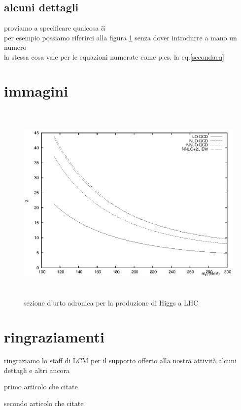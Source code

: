 \documentclass[12pt]{article}
\newcommand{\alphah}{\mbox{$\hat{\alpha}$}}
\begin{document}
\clearpage

\subsection{alcuni dettagli}
proviamo a specificare qualcosa \alphah\\
per esempio possiamo riferirci alla figura \ref{cspph} senza dover 
introdurre a mano un numero\\
la stessa cosa vale per le equazioni numerate come p.es. la eq.\ref{secondaeq}

\section{immagini}
\begin{figure}
\includegraphics[height=100mm,angle=0]{pph.ps}
\caption{sezione d'urto adronica per la produzione di Higgs a LHC}
\label{cspph}
\end{figure}




\clearpage
\section{ringraziamenti}
ringraziamo lo staff di LCM per il supporto offerto alla nostra attivit\`a
alcuni dettagli
e altri ancora

\begin{thebibliography}{99}
 primo articolo che citate

 secondo articolo che citate

\end{thebibliography}
\end{document}

